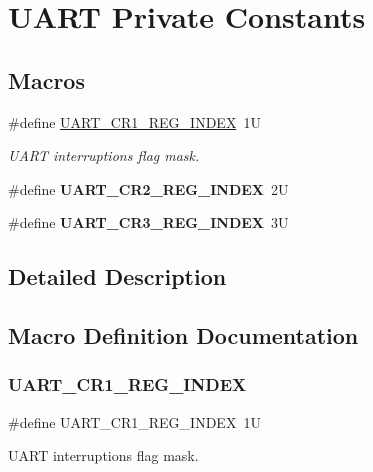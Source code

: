 \hypertarget{group___u_a_r_t___private___constants}{}\section{U\+A\+RT Private Constants}
\label{group___u_a_r_t___private___constants}
\subsection*{Macros}
\begin{DoxyCompactItemize}
\item 
\#define \mbox{\hyperlink{group___u_a_r_t___private___constants_ga5917bcb19b2dab202b8cbfa82520b93e}{U\+A\+R\+T\+\_\+\+C\+R1\+\_\+\+R\+E\+G\+\_\+\+I\+N\+D\+EX}}~1U
\begin{DoxyCompactList}\small\item\em U\+A\+RT interruptions flag mask. \end{DoxyCompactList}\item 
\mbox{\label{group___u_a_r_t___private___constants_ga3a8b0ee44c75493eb001e60a9876e586}} 
\#define {\bfseries U\+A\+R\+T\+\_\+\+C\+R2\+\_\+\+R\+E\+G\+\_\+\+I\+N\+D\+EX}~2U
\item 
\mbox{\label{group___u_a_r_t___private___constants_gac9cb22110b40ab2261468436e3038524}} 
\#define {\bfseries U\+A\+R\+T\+\_\+\+C\+R3\+\_\+\+R\+E\+G\+\_\+\+I\+N\+D\+EX}~3U
\end{DoxyCompactItemize}


\subsection{Detailed Description}


\subsection{Macro Definition Documentation}
\mbox{\label{group___u_a_r_t___private___constants_ga5917bcb19b2dab202b8cbfa82520b93e}} 
\subsubsection{\texorpdfstring{U\+A\+R\+T\+\_\+\+C\+R1\+\_\+\+R\+E\+G\+\_\+\+I\+N\+D\+EX}{UART\_CR1\_REG\_INDEX}}
{\footnotesize\ttfamily \#define U\+A\+R\+T\+\_\+\+C\+R1\+\_\+\+R\+E\+G\+\_\+\+I\+N\+D\+EX~1U}



U\+A\+RT interruptions flag mask. 

